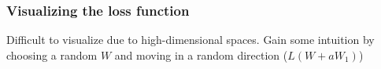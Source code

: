 \documentclass{beamer}
\begin{document}
\begin{frame}
  \frametitle{Visualizing the loss function}
  Difficult to visualize due to high-dimensional spaces. Gain some intuition by choosing a random $W$ and moving in a random direction ($L(W + a W_1)$) 
  \begin{figure}
    \begin{subfigure}{.33\textwidth}
      \centering
    \end{subfigure}%
    \begin{subfigure}{.33\textwidth}
      \centering

\end{subfigure}
\end{figure}
\end{frame}
\end{document}
